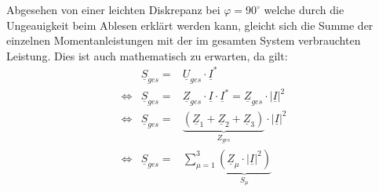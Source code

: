 Abgesehen von einer leichten Diskrepanz bei $\varphi = 90^\circ$ welche durch die Ungeauigkeit beim Ablesen erklärt werden kann, gleicht sich die Summe der einzelnen Momentanleistungen mit der im gesamten System verbrauchten Leistung. Dies ist auch mathematisch zu erwarten, da gilt:
\begin{eqnarray*}
& \underline{S}_{ges} =& \underline{U}_{ges}\cdot\underline{I}^* \\
\Leftrightarrow &\underline{S}_{ges} =& \underline{Z}_{ges}\cdot\underline{I}\cdot\underline{I}^* = \underline{Z}_{ges}\cdot |\underline{I}|^2 \\
\Leftrightarrow & \underline{S}_{ges} =& \underbrace{(\underline{Z}_1 + \underline{Z}_2 + \underline{Z}_3)}_{Z_{ges}} \cdot |\underline{I}|^2 \\
\Leftrightarrow & \underline{S}_{ges} =& \sum_{\mu=1}^3 \underbrace{\left(\underline{Z}_\mu \cdot |\underline{I}|^2\right)}_{S_\mu}\\
\end{eqnarray*}